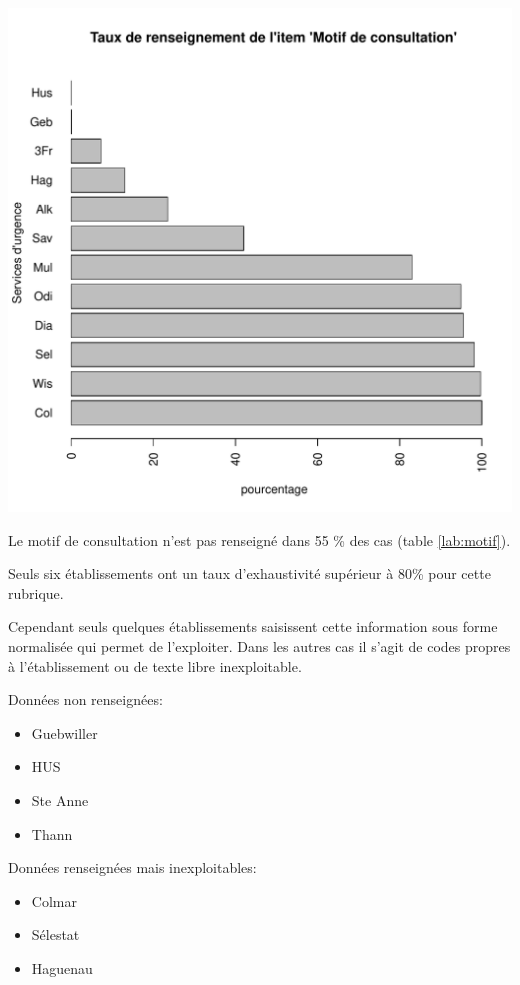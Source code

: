 \documentclass[12pt,english,french,twoside]{book}\usepackage[]{graphicx}\usepackage[]{color}
\makeatletter
\def\maxwidth{ %
  \ifdim\Gin@nat@width>\linewidth
    \linewidth
  \else
    \Gin@nat@width
  \fi
}
\makeatother
\begin{document}
\includegraphics[width=\maxwidth]{figure/motifss2} 



Le motif de consultation n'est pas renseigné dans 55 \% des cas (table \ref{lab:motif}).

Seuls six établissements ont un taux d'exhaustivité supérieur à 80\% pour cette rubrique.

Cependant seuls quelques établissements saisissent cette information sous forme normalisée qui permet de l'exploiter. Dans les autres cas il s'agit de codes propres à l'établissement ou de texte libre inexploitable.

Données non renseignées:
\begin{itemize}
  \item Guebwiller
  \item HUS
  \item Ste Anne
  \item Thann
\end{itemize}

Données renseignées mais inexploitables:
\begin{itemize}
  \item Colmar
  \item Sélestat
  \item Haguenau
\end{itemize}
\end{document}
